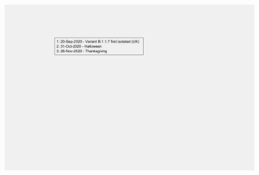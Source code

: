 \documentclass[]{article}
\begin{document}
\begin{figure}[!h]
	\includegraphics[width=\linewidth]{legends/B117_legend.png}
	\caption{}
	\label{fig:legends/B117_legendLabel}
\end{figure}
\end{document}
